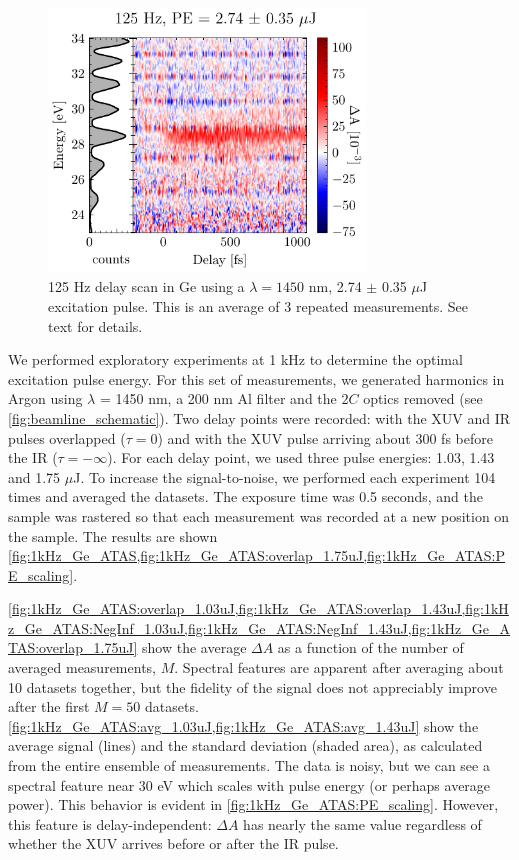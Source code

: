 \begin{figure}
	\centering
	\includegraphics[width=0.75\textwidth]{figures/chap4/Delay234_1450nm_125HzuJ.pdf}
	\caption{125 Hz delay scan in Ge using a $\lambda = 1450$ nm, 2.74 $\pm$ 0.35 $\mu$J excitation pulse. This is an average of 3 repeated measurements. See text for details.}
	\label{fig:125Hz_Ge_ATAS:delay_scan}
\end{figure}

We performed exploratory experiments at 1 kHz to determine the optimal excitation pulse energy. For this set of measurements, we generated harmonics in Argon using $\lambda$ = 1450 nm, a 200 nm Al filter and the $2C$ optics removed (see \cref{fig:beamline_schematic}). Two delay points were recorded: with the XUV and IR pulses overlapped ($\tau = 0$) and with the XUV pulse arriving about 300 fs before the IR ($\tau = -\infty$). For each delay point, we used three pulse energies: 1.03, 1.43 and 1.75 $\mu$J. To increase the signal-to-noise, we performed each experiment 104 times and averaged the datasets. The exposure time was 0.5 seconds, and the sample was rastered so that each measurement was recorded at a new position on the sample. The results are shown \cref{fig:1kHz_Ge_ATAS,fig:1kHz_Ge_ATAS:overlap_1.75uJ,fig:1kHz_Ge_ATAS:PE_scaling}. 

\cref{fig:1kHz_Ge_ATAS:overlap_1.03uJ,fig:1kHz_Ge_ATAS:overlap_1.43uJ,fig:1kHz_Ge_ATAS:NegInf_1.03uJ,fig:1kHz_Ge_ATAS:NegInf_1.43uJ,fig:1kHz_Ge_ATAS:overlap_1.75uJ} show the average $\Delta A$ as a function of the number of averaged measurements, $M$. Spectral features are apparent after averaging about 10 datasets together, but the fidelity of the signal does not appreciably improve after the first $M=50$ datasets. \cref{fig:1kHz_Ge_ATAS:avg_1.03uJ,fig:1kHz_Ge_ATAS:avg_1.43uJ} show the average signal (lines) and the standard deviation (shaded area), as calculated from the entire ensemble of measurements. The data is noisy, but we can see a spectral feature near 30 eV which scales with pulse energy (or perhaps average power). This behavior is evident in \cref{fig:1kHz_Ge_ATAS:PE_scaling}. However, this feature is delay-independent: $\Delta A$ has nearly the same value regardless of whether the XUV arrives before or after the IR pulse.

